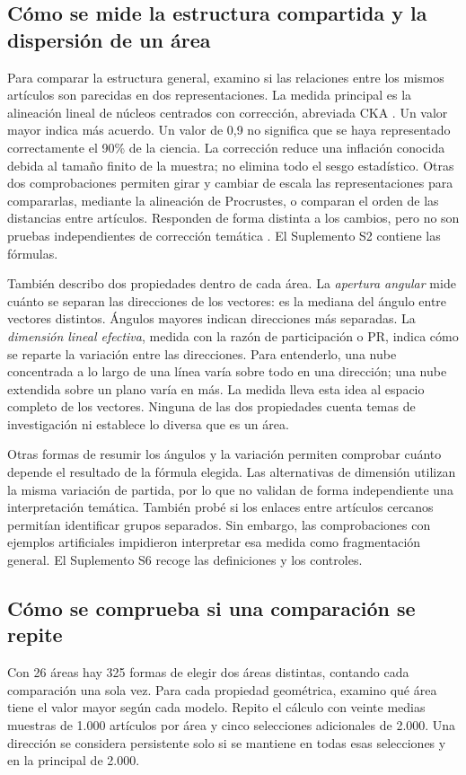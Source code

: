 \subsection{Cómo se mide la estructura compartida y la dispersión de un área}
Para comparar la estructura general, examino si las relaciones entre los mismos artículos son parecidas en dos representaciones. La medida principal es la alineación lineal de núcleos centrados con corrección, abreviada CKA \citep{pmlr-v97-kornblith19a,refa961d84a4e}. Un valor mayor indica más acuerdo. Un valor de 0,9 no significa que se haya representado correctamente el 90\% de la ciencia. La corrección reduce una inflación conocida debida al tamaño finito de la muestra; no elimina todo el sesgo estadístico. Otras dos comprobaciones permiten girar y cambiar de escala las representaciones para compararlas, mediante la alineación de Procrustes, o comparan el orden de las distancias entre artículos. Responden de forma distinta a los cambios, pero no son pruebas independientes de corrección temática \citep{NEURIPS2021_252a3dba,pmlr-v285-williams24a}. El Suplemento S2 contiene las fórmulas.

También describo dos propiedades dentro de cada área. La \emph{apertura angular} mide cuánto se separan las direcciones de los vectores: es la mediana del ángulo entre vectores distintos. Ángulos mayores indican direcciones más separadas. La \emph{dimensión lineal efectiva}, medida con la razón de participación o PR, indica cómo se reparte la variación entre las direcciones. Para entenderlo, una nube concentrada a lo largo de una línea varía sobre todo en una dirección; una nube extendida sobre un plano varía en más. La medida lleva esta idea al espacio completo de los vectores. Ninguna de las dos propiedades cuenta temas de investigación ni establece lo diversa que es un área.

Otras formas de resumir los ángulos y la variación permiten comprobar cuánto depende el resultado de la fórmula elegida. Las alternativas de dimensión utilizan la misma variación de partida, por lo que no validan de forma independiente una interpretación temática. También probé si los enlaces entre artículos cercanos permitían identificar grupos separados. Sin embargo, las comprobaciones con ejemplos artificiales impidieron interpretar esa medida como fragmentación general. El Suplemento S6 recoge las definiciones y los controles.

\subsection{Cómo se comprueba si una comparación se repite}
Con 26 áreas hay 325 formas de elegir dos áreas distintas, contando cada comparación una sola vez. Para cada propiedad geométrica, examino qué área tiene el valor mayor según cada modelo. Repito el cálculo con veinte medias muestras de 1.000 artículos por área y cinco selecciones adicionales de 2.000. Una dirección se considera persistente solo si se mantiene en todas esas selecciones y en la principal de 2.000.


